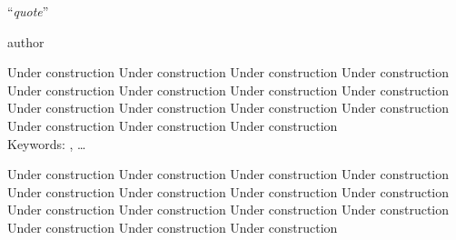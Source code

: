\documentclass[
11pt, %
english, %
singlespacing, %
headsepline, %
]{MastersDoctoralThesis} %
\begin{document}



\vspace*{0.2\textheight}

\noindent\enquote{\itshape quote}\bigbreak

\hfill author



%

Under construction Under construction Under construction Under construction Under construction
Under construction Under construction Under construction Under construction Under construction
Under construction Under construction Under construction Under construction Under construction 
\\

Keywords: \keywordnames, \ldots



%

Under construction Under construction Under construction Under construction Under construction
Under construction Under construction Under construction Under construction Under construction
Under construction Under construction Under construction Under construction Under construction 
\\
\end{document}
